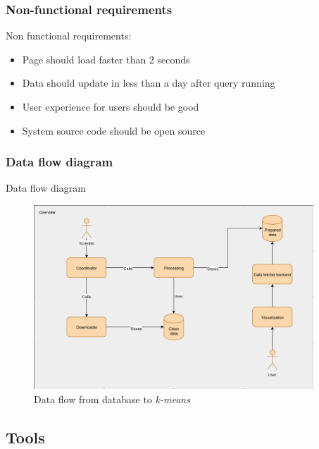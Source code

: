 \documentclass[a4paper,12pt]{article}
\begin{document}
   	\hfill
   	
   	\subsubsection{Non-functional requirements}
   	
   	Non functional requirements:
   	\begin{itemize}
   		\item Page should load faster than 2 seconds
  		\item Data should update in less than a day after query running
  		\item User experience for users should be good
  		\item System source code should be open source
   	\end{itemize}
   	
   	\hfill
   	
  	\subsubsection{Data flow diagram}
		Data flow diagram
		        \begin{figure}[H]	
		    	\centering
		    	\includegraphics[width=10.5cm]{images/data_flow_overview.png}
		    	\caption{Data flow from database to \textit{k-means}}
		    	\label{fig:data_flow_pipeline}
		    \end{figure}
		
		    \vspace{1cm}
  	\subsection{Tools}
    
\end{document}

